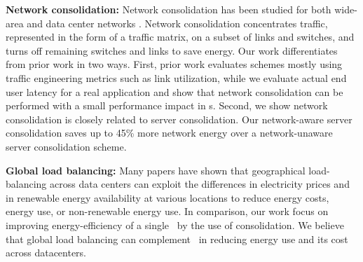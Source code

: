 
\textbf{Network consolidation:} Network  consolidation has been studied for both wide-area and data center networks \cite{response, elasticTree, greenTE, Chiaraviglio, Andrews}. Network consolidation concentrates traffic, represented in the form of a traffic matrix, on a subset of links and switches, and turns off remaining switches and links to save energy. Our work differentiates from prior work in two ways. First, prior work evaluates schemes mostly using traffic engineering metrics such as link utilization, while we evaluate actual end user latency for a real application and show that network consolidation can be performed with a small performance impact in \cdc s. Second, we show network consolidation is closely related to server consolidation. Our network-aware server consolidation saves up to 45\% more network energy over a network-unaware server consolidation scheme.
%
%
%
%
%
%
%

\textbf{Global load balancing:} Many papers \cite{Liu11,qureshi2009cutting,Gao12,Rao10}  have shown that geographical load-balancing across data centers can exploit the differences in electricity prices and in renewable energy availability at various locations to reduce energy costs, energy use, or non-renewable energy use.  In comparison, our work focus on improving energy-efficiency of a single \cdc\ by the use of consolidation. We believe that global load balancing can complement \shrink\ in reducing energy use and its cost across datacenters.
